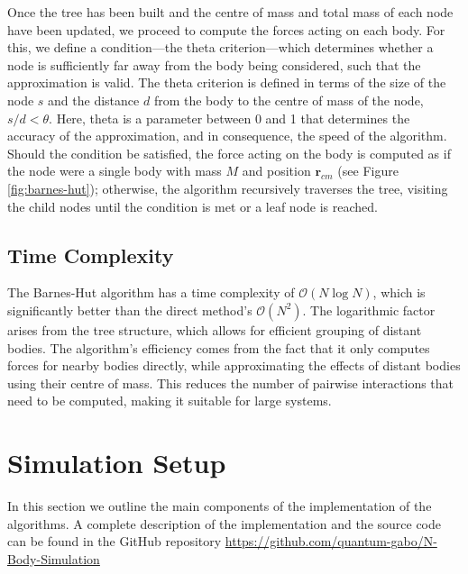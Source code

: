 \documentclass[runningheads]{llncs}
\begin{document}
Once the tree has been built and the centre of mass and total mass of each node have been updated, we proceed to compute the forces acting on each body. For this, we define a condition---the theta criterion---which determines whether a node is sufficiently far away from the body being considered, such that the approximation is valid. The theta criterion is defined in terms of the size of the node $s$ and the distance $d$ from the body to the centre of mass of the node, $s/d < \theta$. Here, theta is a parameter between 0 and 1 that determines the accuracy of the approximation, and in consequence, the speed of the algorithm. Should the condition be satisfied, the force acting on the body is computed as if the node were a single body with mass $M$ and position $\mathbf{r}_{cm}$ (see Figure \ref{fig:barnes-hut}); otherwise, the algorithm recursively traverses the tree, visiting the child nodes until the condition is met or a leaf node is reached.   

\subsection{Time Complexity}
The Barnes-Hut algorithm has a time complexity of $\mathcal{O}(N\log N)$, which is significantly better than the direct method's $\mathcal{O}(N^2)$. The logarithmic factor arises from the tree structure, which allows for efficient grouping of distant bodies. The algorithm's efficiency comes from the fact that it only computes forces for nearby bodies directly, while approximating the effects of distant bodies using their centre of mass. This reduces the number of pairwise interactions that need to be computed, making it suitable for large systems.

\section{Simulation Setup}
In this section we outline the main components of the implementation of the algorithms. A complete description of the implementation and the source code can be found in the GitHub repository \url{https://github.com/quantum-gabo/N-Body-Simulation}
\end{document}
